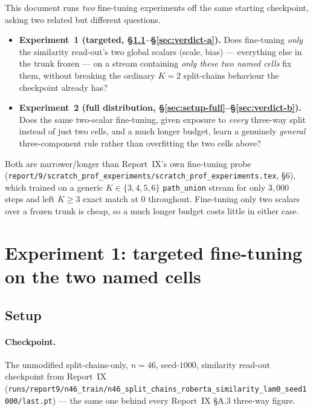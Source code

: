 \documentclass[11pt,a4paper]{article}
\begin{document}
This document runs \emph{two} fine-tuning experiments off the same starting checkpoint, asking
two related but different questions.

\begin{itemize}\setlength\itemsep{0.15em}
  \item \textbf{Experiment~1 (targeted, \S\ref{sec:setup}--\S\ref{sec:verdict-a}).} Does
        fine-tuning \emph{only} the similarity read-out's two global scalars (scale, bias) ---
        everything else in the trunk frozen --- on a stream containing \emph{only these two named
        cells} fix them, without breaking the ordinary $K{=}2$ split-chains behaviour the
        checkpoint already has?
  \item \textbf{Experiment~2 (full distribution, \S\ref{sec:setup-full}--\S\ref{sec:verdict-b}).}
        Does the same two-scalar fine-tuning, given exposure to \emph{every} three-way split
        instead of just two cells, and a much longer budget, learn a genuinely \emph{general}
        three-component rule rather than overfitting the two cells above?
\end{itemize}

Both are narrower/longer than Report~IX's own fine-tuning probe
(\texttt{report/9/scratch\_prof\_experiments/scratch\_prof\_experiments.tex}, \S6), which trained
on a generic $K\in\{3,4,5,6\}$ \texttt{path\_union} stream for only $3{,}000$ steps and left
$K{\ge}3$ exact match at $0$ throughout. Fine-tuning only two scalars over a frozen trunk is
cheap, so a much longer budget costs little in either case.

\section{Experiment 1: targeted fine-tuning on the two named cells}
\label{sec:exp1}

\subsection{Setup}
\label{sec:setup}

\paragraph{Checkpoint.} The unmodified split-chains-only, $n{=}46$, seed-$1000$, similarity
read-out checkpoint from Report~IX
(\texttt{runs/report9/n46\_train/n46\_split\_chains\_roberta\_similarity\_lam0\_seed1000/last.pt}) ---
the same one behind every Report~IX \S A.3 three-way figure.
\end{document}
